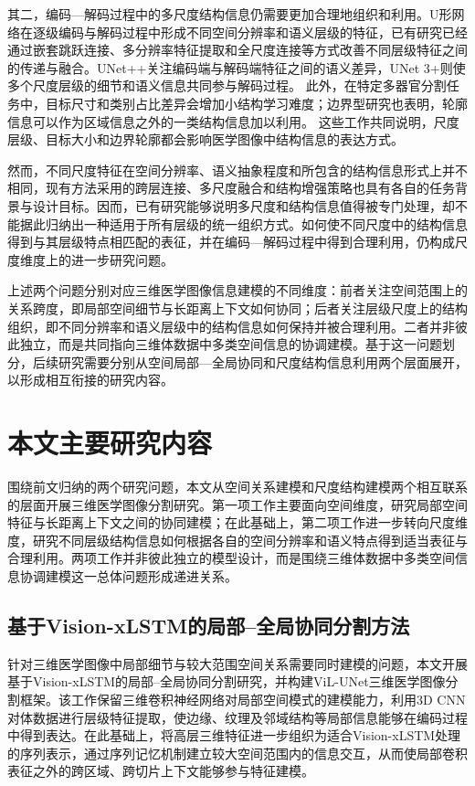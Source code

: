 其二，编码—解码过程中的多尺度结构信息仍需要更加合理地组织和利用。U形网络在逐级编码与解码过程中形成不同空间分辨率和语义层级的特征，已有研究已经通过嵌套跳跃连接、多分辨率特征提取和全尺度连接等方式改善不同层级特征之间的传递与融合。UNet++关注编码端与解码端特征之间的语义差异，UNet 3+则使多个尺度层级的细节和语义信息共同参与解码过程。\cite{zhou2018unetpp,huang2020unet3plus} 此外，在特定多器官分割任务中，目标尺寸和类别占比差异会增加小结构学习难度；边界型研究也表明，轮廓信息可以作为区域信息之外的一类结构信息加以利用。\cite{gao2019focusnet,kervadec2021boundary} 这些工作共同说明，尺度层级、目标大小和边界轮廓都会影响医学图像中结构信息的表达方式。

然而，不同尺度特征在空间分辨率、语义抽象程度和所包含的结构信息形式上并不相同，现有方法采用的跨层连接、多尺度融合和结构增强策略也具有各自的任务背景与设计目标。因而，已有研究能够说明多尺度和结构信息值得被专门处理，却不能据此归纳出一种适用于所有层级的统一组织方式。如何使不同尺度中的结构信息得到与其层级特点相匹配的表征，并在编码—解码过程中得到合理利用，仍构成尺度维度上的进一步研究问题。\cite{kervadec2021boundary,zhou2018unetpp,huang2020unet3plus}

上述两个问题分别对应三维医学图像信息建模的不同维度：前者关注空间范围上的关系跨度，即局部空间细节与长距离上下文如何协同；后者关注层级尺度上的结构组织，即不同分辨率和语义层级中的结构信息如何保持并被合理利用。二者并非彼此独立，而是共同指向三维体数据中多类空间信息的协调建模。基于这一问题划分，后续研究需要分别从空间局部—全局协同和尺度结构信息利用两个层面展开，以形成相互衔接的研究内容。

\section{本文主要研究内容}

围绕前文归纳的两个研究问题，本文从空间关系建模和尺度结构建模两个相互联系的层面开展三维医学图像分割研究。第一项工作主要面向空间维度，研究局部空间特征与长距离上下文之间的协同建模；在此基础上，第二项工作进一步转向尺度维度，研究不同层级结构信息如何根据各自的空间分辨率和语义特点得到适当表征与合理利用。两项工作并非彼此独立的模型设计，而是围绕三维体数据中多类空间信息协调建模这一总体问题形成递进关系。

\subsection{基于Vision-xLSTM的局部--全局协同分割方法}

针对三维医学图像中局部细节与较大范围空间关系需要同时建模的问题，本文开展基于Vision-xLSTM的局部--全局协同分割研究，并构建ViL-UNet三维医学图像分割框架。该工作保留三维卷积神经网络对局部空间模式的建模能力，利用3D CNN对体数据进行层级特征提取，使边缘、纹理及邻域结构等局部信息能够在编码过程中得到表达。在此基础上，将高层三维特征进一步组织为适合Vision-xLSTM处理的序列表示，通过序列记忆机制建立较大空间范围内的信息交互，从而使局部卷积表征之外的跨区域、跨切片上下文能够参与特征建模。

